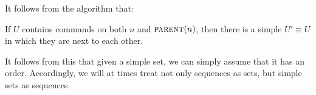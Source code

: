 

It follows from the algorithm that:
\begin{mycor}\label{lemma:neighbor}
If $U$ contains commands on both $n$ and $\text{\normalfont\scshape{parent}}(n)$, then
there is a simple $U'\equiv U$ in which they are next to each other.
\end{mycor}



It follows from this that given a simple set,
we can simply assume that it has an order.
Accordingly, we will at times treat not only sequences as sets,
but simple sets as sequences.

